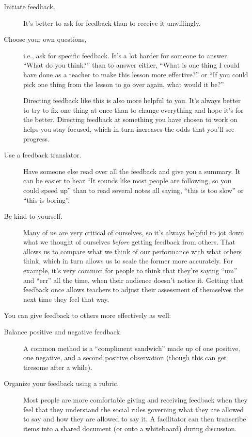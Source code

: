 \begin{description}

  \item[Initiate feedback.] It's better to ask for feedback than to
    receive it unwillingly.

  \item[Choose your own questions,] i.e., ask for specific feedback.
    It's a lot harder for someone to answer, ``What do you think?''
    than to answer either, ``What is one thing I could have done as a
    teacher to make this lesson more effective?'' or ``If you could
    pick one thing from the lesson to go over again, what would it
    be?''

    Directing feedback like this is also more helpful to you. It's
    always better to try to fix one thing at once than to change
    everything and hope it's for the better. Directing feedback at
    something you have chosen to work on helps you stay focused, which
    in turn increases the odds that you'll see progress.

  \item[Use a feedback translator.] Have someone else read over all
    the feedback and give you a summary. It can be easier to hear ``It
    sounds like most people are following, so you could speed up''
    than to read several notes all saying, ``this is too slow'' or
    ``this is boring''.

  \item[Be kind to yourself.] Many of us are very critical of
    ourselves, so it's always helpful to jot down what we thought of
    ourselves \emph{before} getting feedback from others. That allows
    us to compare what we think of our performance with what others
    think, which in turn allows us to scale the former more
    accurately.  For example, it's very common for people to think
    that they're saying ``um'' and ``err'' all the time, when their
    audience doesn't notice it. Getting that feedback once allows
    teachers to adjust their assessment of themselves the next time
    they feel that way.

\end{description}

\noindent
You can give feedback to others more effectively as well:

\begin{description}

  \item[Balance positive and negative feedback.] A common method is a
    ``compliment sandwich'' made up of one positive, one negative, and
    a second positive observation (though this can get tiresome after
    a while).

  \item[Organize your feedback using a rubric.] Most people are more
    comfortable giving and receiving feedback when they feel that they
    understand the social rules governing what they are allowed to say
    and how they are allowed to say it. A facilitator can then
    transcribe items into a shared document (or onto a whiteboard)
    during discussion.

\end{description}

